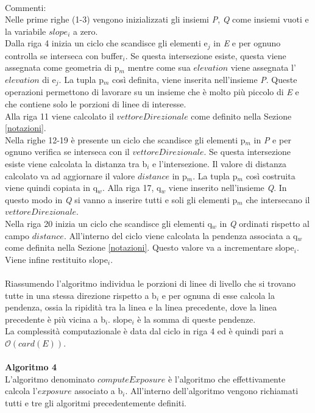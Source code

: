 \mbox{}\\
Commenti:\\
Nelle prime righe (1-3) vengono inizializzati gli insiemi \textit{P}, \textit{Q} come insiemi vuoti e la variabile $slope_i$ a zero.\\
Dalla riga 4 inizia un ciclo che scandisce gli elementi e$_j$ in \textit{E} e per ognuno controlla se interseca con buffer$_i$. Se questa intersezione esiste, questa viene assegnata come geometria di p$_m$ mentre come sua $elevation$ viene assegnata l'$elevation$ di e$_j$. La tupla p$_m$ così definita, viene inserita nell'insieme \textit{P}. Queste operazioni permettono di lavorare su un insieme che è molto più piccolo di \textit{E} e che contiene solo le porzioni di linee di interesse.\\
Alla riga 11 viene calcolato il $vettoreDirezionale$ come definito nella Sezione \ref{notazioni}.\\
Nella righe 12-19 è presente un ciclo che scandisce gli elementi p$_m$ in \textit{P} e per ognuno verifica se interseca con il $vettoreDirezionale$. Se questa intersezione esiste viene calcolata la distanza tra b$_i$ e l'intersezione. Il valore di distanza calcolato va ad aggiornare il valore $distance$ in p$_m$. La tupla p$_m$  così costruita viene quindi copiata in q$_w$. Alla riga 17, q$_w$ viene inserito nell'insieme  \textit{Q}. In questo modo in \textit{Q} si vanno a inserire tutti e soli gli elementi p$_m$ che intersecano il $vettoreDirezionale$. \\
Nella riga 20 inizia un ciclo che scandisce gli elementi q$_w$ in \textit{Q} ordinati rispetto al campo $distance$. All'interno del ciclo viene calcolata la pendenza associata a q$_w$ come definita nella Sezione \ref{notazioni}. Questo valore va a incrementare slope$_i$.\\ 
Viene infine restituito slope$_i$.\\
\mbox{}\\
Riassumendo l'algoritmo individua le porzioni di linee di livello che si trovano tutte in una stessa direzione rispetto a b$_i$ e per ognuna di esse calcola la pendenza, ossia la ripidità tra la linea e la linea precedente, dove la linea precedente è più vicina a b$_i$. slope$_i$ è la somma di queste pendenze.\\
La complessità computazionale è data dal ciclo in riga 4 ed è quindi pari a $\mathcal{O}(card(\textit{E}))$.\\
\mbox{}\\
\newpage
\textbf{Algoritmo 4}\\
\newline
L'algoritmo denominato $computeExposure$ è l'algoritmo che effettivamente calcola l'$exposure$ associato a b$_i$. All'interno dell'algoritmo vengono richiamati tutti e tre gli algoritmi precedentemente definiti.\\


